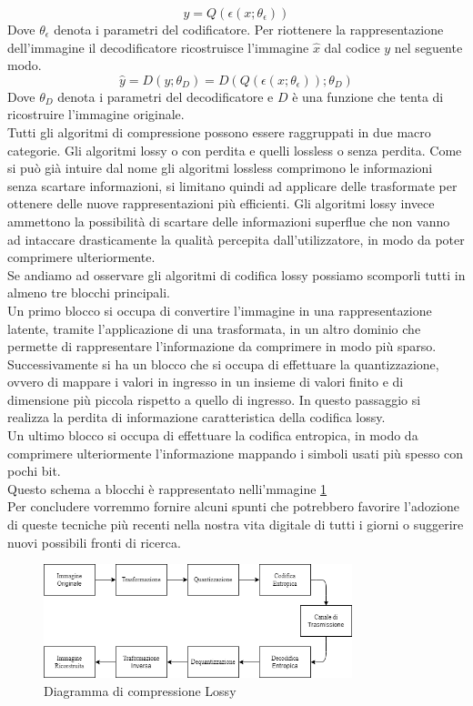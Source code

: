 \begin{equation}\label{eq:eqCondificatore}
    y = Q(\epsilon (x;\theta_{\epsilon}))
\end{equation}
Dove $\theta_{\epsilon}$ denota i parametri del codificatore.
Per riottenere la rappresentazione dell’immagine il decodificatore ricostruisce l’immagine $\hat{x}$ dal codice $y$ nel seguente modo.\\
\begin{equation}\label{eq:eqDecodificatore}
    \hat{y} = D(y;\theta_{D}) = D(Q(\epsilon (x;\theta_{\epsilon}));\theta_{D})
\end{equation}
Dove $\theta_{D}$ denota i parametri del decodificatore e $D$ è una funzione che tenta di ricostruire l'immagine originale.\cite{hu2021learning}\\
Tutti gli algoritmi di compressione possono essere raggruppati in due macro categorie. Gli algoritmi lossy o con perdita e quelli lossless o senza perdita. Come si può già intuire dal nome gli algoritmi lossless comprimono le informazioni senza scartare informazioni, si limitano quindi ad applicare delle trasformate per ottenere delle nuove rappresentazioni più efficienti. Gli algoritmi lossy invece ammettono la possibilità di scartare delle informazioni superflue che non vanno ad intaccare drasticamente la qualità percepita dall'utilizzatore, in modo da poter comprimere ulteriormente.\\
Se andiamo ad osservare gli algoritmi di codifica lossy possiamo scomporli tutti in almeno tre blocchi principali.\cite{sadeeq2021image} \\
Un primo blocco si occupa di convertire l’immagine in una rappresentazione latente, tramite l’applicazione di una trasformata, in un altro dominio che permette di rappresentare l’informazione da comprimere in modo più sparso.\\
Successivamente si ha un blocco che si occupa di effettuare la quantizzazione, ovvero di mappare i valori in ingresso in un insieme di valori finito e di dimensione più piccola rispetto a quello di ingresso. In questo passaggio si realizza la perdita di informazione caratteristica della codifica lossy.\\
Un ultimo blocco si occupa di effettuare la codifica entropica, in modo da comprimere ulteriormente l’informazione mappando i simboli usati più spesso con pochi bit.\\
Questo schema a blocchi è rappresentato nelli'mmagine \ref{fig:LossyCompressorDiagram}\\
Per concludere vorremmo fornire alcuni spunti che potrebbero favorire l’adozione di queste tecniche più recenti nella nostra vita digitale di tutti i giorni o suggerire nuovi possibili fronti di ricerca.
\begin{figure}[t!]
    \centering
    \includegraphics[width=0.8\textwidth]{Immagini/LossyCompressorDiagram.png}
    \caption{Diagramma di compressione Lossy}
    \label{fig:LossyCompressorDiagram}
\end{figure}
